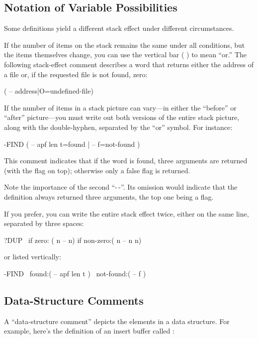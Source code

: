 \subsection{Notation of Variable Possibilities}
Some definitions yield a different stack effect under different
circumstances.

If the number of items on the stack remains the same under all
conditions, but the items themselves change, you can use the vertical
bar ( \forth{|} ) to mean ``or.'' The following stack-effect comment
describes a word that returns either the address of a file or, if the
requested file is not found, zero:
\begin{Code}
( -- address|O=undefined-file)
\end{Code}
If the number of items in a stack picture can vary---in either the
``before'' or ``after'' picture---you must write out both versions of
the entire stack
picture, along with the double-hyphen, separated by the ``or'' symbol.
For instance:
\begin{Code}
-FIND   ( -- apf len t=found | -- f=not-found )
\end{Code}
This comment indicates that if the word is found, three arguments are
returned (with the flag on top); otherwise only a false flag is
returned.

Note the importance of the second ``-\,-''.  Its omission would indicate
that the definition always returned three arguments, the top one being
a flag.

If you prefer, you can write the entire stack effect twice, either on
the same line, separated by three spaces:
\begin{Code}
?DUP   \ if zero: ( n -- n)    if non-zero:( n -- n n)
\end{Code}
or listed vertically:
\begin{Code}
-FIND  \     found:( -- apf len t )
       \ not-found:( -- f )
\end{Code}

\subsection{Data-Structure Comments}

A ``data-structure comment'' depicts the elements in a data structure.
For example, here's the definition of an insert buffer called
 :

